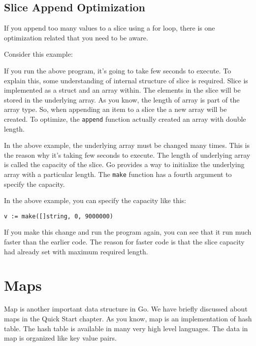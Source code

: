 \subsection{Slice Append Optimization}

If you append too many values to a slice using a
for loop, there is one optimization related that you need to be aware.

Consider this example:



If you run the above program, it's going to take few seconds to
execute.  To explain this, some understanding of internal structure of
slice is required.  Slice is implemented as a struct and an array
within.  The elements in the slice will be stored in the underlying
array.  As you know, the length of array is part of the array type.
So, when appending an item to a slice the a new array will be created.
To optimize, the \texttt{append} function actually created an array
with double length.

In the above example, the underlying array must be changed many times.
This is the reason why it's taking few seconds to execute.  The length
of underlying array is called the capacity of the slice.  Go provides
a way to initialize the underlying array with a particular length.
The \texttt{make} function has a fourth argument to specify the
capacity.

In the above example, you can specify the capacity like this:

\begin{lstlisting}[numbers=none]
v := make([]string, 0, 9000000)
\end{lstlisting}

If you make this change and run the program again, you can see that it
run much faster than the earlier code.  The reason for faster code is
that the slice capacity had already set with maximum required length.

\section{Maps}

Map is another important data structure in Go.  We have
briefly discussed about maps in the Quick Start chapter.  As you know,
map is an implementation of hash table.  The hash table is available
in many very high level languages.  The data in map is organized like
key value pairs.

